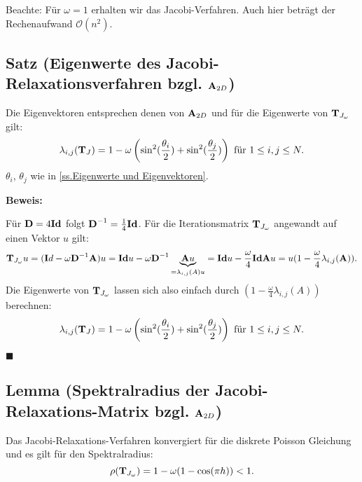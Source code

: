 Beachte: Für $\omega = 1$ erhalten wir das Jacobi-Verfahren. Auch hier beträgt der Rechenaufwand $\mathcal{O}(n^{2})$.

\subsection{Satz (Eigenwerte des Jacobi-Relaxationsverfahren bzgl. ${\textbf{A}}_{2D}$)}\label{ss.EW Relax}

Die Eigenvektoren entsprechen denen von ${\textbf{A}}_{2D}$ und für die Eigenwerte von ${\textbf{T}}_{J_{\omega}}$ gilt:
\begin{equation}
\lambda_{i,j}({\textbf{T}}_{J}) = 1 - \omega \left(\sin^{2}(\frac {\theta_{i}} {2}) + \sin^{2}(\frac {\theta_{j}} {2}) \right) \textnormal{ für } 1 \le i,j \le N.\label{eq.Jacobi-Eigenwerte}
\end{equation}
$\theta_{i}$, $\theta_{j}$ wie in \autoref{ss.Eigenwerte und Eigenvektoren}.

\textbf{Beweis:}\label{sss.EW JacobiRelax}

Für ${\textbf{D}} = 4 {\textbf{Id}}$ folgt ${\textbf{D}}^{-1} = \frac {1} {4} {\textbf{Id}}$. Für die Iterationsmatrix ${\textbf{T}}_{J_{\omega}}$ angewandt auf einen Vektor $u$ gilt:
\begin{eqnarray}
{\textbf{T}}_{J_{\omega}}u = ({\textbf{I}}d - \omega {\textbf{D}}^{-1}{\textbf{A}})u = {\textbf{Id}} u - \omega {\textbf{D}}^{-1} \underbrace{{\textbf{A}}u}_{=\lambda_{i,j}(A) u} = {\textbf{Id}} u - \frac {\omega} {4} {\textbf{Id}} {\textbf{A}} u = u (1 - \frac {\omega} {4} \lambda_{i,j}({\textbf{A}})). \notag
\end{eqnarray}
Die Eigenwerte von ${\textbf{T}}_{J_{\omega}}$ lassen sich also einfach durch $(1 - \frac {\omega} {4} \lambda_{i,j}(A))$ berechnen:
\begin{equation}
\lambda_{i,j}({\textbf{T}}_{J}) = 1 - \omega \left(\sin^{2}(\frac {\theta_{i}} {2}) + \sin^{2}(\frac {\theta_{j}} {2}) \right) \textnormal{ für } 1 \le i,j \le N. \notag
\end{equation}
\begin{flushright}
$\blacksquare$
\end{flushright}

\subsection{Lemma (Spektralradius der Jacobi-Relaxations-Matrix bzgl. ${\textbf{A}}_{2D}$)}\label{ss.Spektralradius Jacobi Relax}

Das Jacobi-Relaxations-Verfahren konvergiert für die diskrete Poisson Gleichung und es gilt für den Spektralradius:
\begin{equation}
\rho({\textbf{T}}_{J_{\omega}}) = 1 - \omega(1 - \cos (\pi h)) < 1.
\end{equation}

